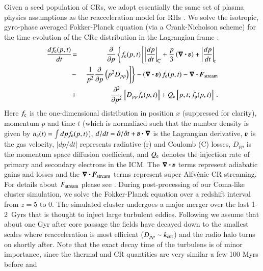 \documentclass[a4paper,fleqn,usenatbib]{mnras}
\newcommand{\bcdot}{\ensuremath{%
  \mathchoice%
   {\mskip\thinmuskip\lower0.2ex\hbox{\scalebox{1.5}{$\cdot$}}\mskip\thinmuskip}}%
   {\mskip\thinmuskip\lower0.2ex\hbox{\scalebox{1.5}{$\cdot$}}\mskip\thinmuskip}%
   {\lower0.3ex\hbox{\scalebox{1.2}{$\cdot$}}}%
   {\lower0.3ex\hbox{\scalebox{1.2}{$\cdot$}}}%
}
\renewcommand{\vec}{\ensuremath{\mathbfit}}
\newcommand{\bvel}{\ensuremath{\boldsymbol{\varv}}}
\newcommand{\bnabla}{\ensuremath{\boldsymbol{\nabla}}}
\begin{document}
Given a seed population of CRs, we adopt essentially the same set of
plasma physics assumptions as the reacceleration model for RHs
\citep{brunetti07,brunetti11}. We solve the isotropic, gyro-phase
averaged Fokker-Planck equation (via a Crank-Nicholson scheme) for the
time evolution of the CRe distribution in the Lagrangian frame
\citep{brunetti07,brunetti11}:
\begin{eqnarray}
{{d f_{\rmn{e}}(p,t)}\over{d t}} &\!=&
\frac{\partial}{\partial p}
\left\{
f_{\rmn{e}}(p,t)\left[
\left|{{dp}\over{dt}}\right|_{\rm C} 
+ \frac{p}{3}\left(\bnabla\bcdot \bvel\right)
+ \left|{{dp}\over{dt}}\right|_{\rm r}\right.\right.
\nonumber\\
&-& \left.\left.{1\over{p^2}}{{\partial }\over{\partial p}}\left(p^2 D_{pp}\right) 
\right]\right\} - \left(\bnabla\bcdot \bvel\right) f_{\rmn{e}}(p,t)
- \bnabla\bcdot \vec{F}_\rmn{stream}
\nonumber\\
&+& {{\partial^2 }\over{\partial p^2}}
\left[
D_{pp} f_{\rmn{e}}(p,t) \right]+ Q_{\rmn{e}}\left[p,t;f_{\rmn{p}}(p,t)\right]   \, .
\label{elettroni}
\end{eqnarray}
Here $f_{{\mathrm{e}}}$ is the one-dimensional distribution in position $x$
(suppressed for clarity), momentum $p$ and time $t$ (which is
normalized such that the number density is given by
$n_{{\mathrm{e}}}(t)=\int d p f_{{\mathrm{e}}}(p,t)$), $d/dt=\partial/\partial
t+\bvel\bcdot\bnabla$ is the Lagrangian derivative, $\bvel$ is the gas
velocity, $|dp/dt|$ represents radiative (r) and Coulomb (C) losses,
$D_{pp}$ is the momentum space diffusion coefficient, and
$Q_{{\mathrm{e}}}$ denotes the injection rate of primary and secondary
electrons in the ICM. The $\bnabla\bcdot \bvel$ terms represent
adiabatic gains and losses and the $\bnabla\bcdot
\vec{F}_\rmn{stream}$ terms represent super-Alfv{\'e}nic CR
streaming. For details about $F_{\mathrm{stream}}$ please see
\citet{wiener13}. During post-processing of our Coma-like cluster
simulation, we solve the Fokker-Planck equation over a redshift
interval from $z=5$ to 0. The simulated cluster undergoes a major
merger over the last 1-2~Gyrs that is thought to inject large
turbulent eddies. Following \citet{brunetti07,brunetti11} \citep[see
  also][]{2004ApJ...614..757Y,2015ApJ...800...60M} we assume that
about one Gyr after core passage the fields have decayed down to the
smallest scales where reacceleration is most efficient ($D_{pp}\sim
k_{\mathrm{cut}}$) and the radio halo turns on shortly after. Note that the
exact decay time of the turbulens is of minor importance, since the
thermal and CR quantities are very similar a few 100 Myrs before and
\end{document}
